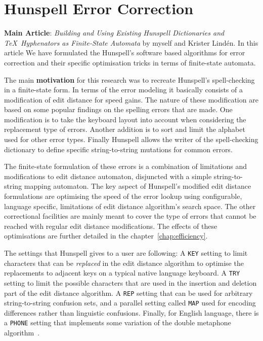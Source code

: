 \documentclass[officiallayout]{unihelcompling}
\begin{document}
\section{Hunspell Error Correction}
\label{sec:Hunspell-error}

\textbf{Main Article}: \emph{Building and Using Existing Hunspell Dictionaries
and \TeX\ Hyphenators as Finite-State Automata} by myself and Krister Lindén.
In this article We have formulated the Hunspell's software based algorithms for
error correction and their specific optimisation tricks in terms of
finite-state automata.

The main \textbf{motivation} for this research was to recreate Hunspell's
spell-checking in a finite-state form. In terms of the  error modeling it
basically consists of a modification of edit distance for speed gains. The
nature of these modification are based on some popular findings on the spelling
errors that are made. One modification is to take the keyboard layout into
account when considering the replacement type of errors. Another addition is to
sort and limit the alphabet used for other error types. Finally Hunspell allows
the writer of the spell-checking dictionary to define specific string-to-string
mutations for common errors.

The finite-state formulation of these errors is a combination of limitations
and modifications to edit distance automaton, disjuncted with a simple
string-to-string mapping automaton. The key aspect of Hunspell's modified
edit distance formulations are optimising the speed of the error lookup using
configurable, language specific, limitations of edit distance algorithm's
search space. The other correctional facilities are mainly meant to cover the
type of errors that cannot be reached with regular edit distance modifications.
The effects of these optimisations are further detailed in the 
chapter~\ref{chap:efficiency}.

The settings that Hunspell gives to a user are following: A \texttt{KEY}
setting to limit characters that can be \emph{replaced} in the edit distance
algorithm to optimise the replacements to adjacent keys on a typical native
language keyboard. A \texttt{TRY} setting to limit the possible characters
that are used in the insertion and deletion part of the edit distance
algorithm. A \texttt{REP} setting that can be used for arbitrary
string-to-string confusion sets, and a parallel setting called \texttt{MAP}
used for encoding differences rather than linguistic confusions.  Finally, for
English language, there is a \texttt{PHONE} setting that implements some
variation of the double metaphone algorithm~\citep{philips2000double}.
\end{document}

